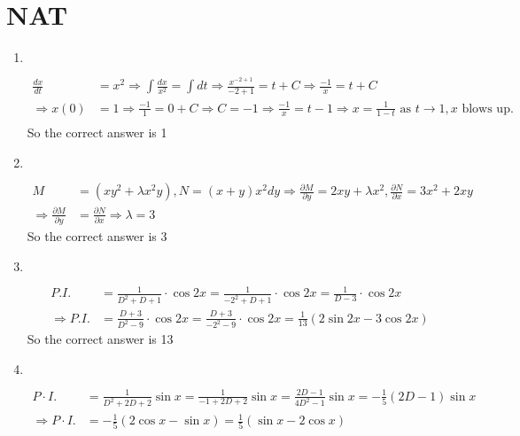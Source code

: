 \section{NAT}
\begin{enumerate}
	\item $\left. \right. $
	\begin{answer}
		\begin{align*}
		\frac{d x}{d t}&=x^{2} \Rightarrow \int \frac{d x}{x^{2}}=\int d t \Rightarrow \frac{x^{-2+1}}{-2+1}=t+C \Rightarrow \frac{-1}{x}=t+C\\
		\Rightarrow x(0)&=1 \Rightarrow \frac{-1}{1}=0+C \Rightarrow C=-1 \Rightarrow \frac{-1}{x}=t-1 \Rightarrow x=\frac{1}{1-t}\text{ as }t \rightarrow 1, x\text{ blows up.}\\
		\end{align*}
			So the correct answer is 1
	\end{answer}
		\item $\left. \right. $
	\begin{answer}
		\begin{align*}
		M&=\left(x y^{2}+\lambda x^{2} y\right), N=(x+y) x^{2} d y \Rightarrow \frac{\partial M}{\partial y}=2 x y+\lambda x^{2}, \frac{\partial N}{\partial x}=3 x^{2}+2 x y\\
		\Rightarrow \frac{\partial M}{\partial y}&=\frac{\partial N}{\partial x} \Rightarrow \lambda=3
		\end{align*}
			So the correct answer is 3
	\end{answer}
		\item $\left. \right. $
	\begin{answer}
		\begin{align*}
			P.I. &=\frac{1}{D^{2}+D+1} \cdot \cos 2 x=\frac{1}{-2^{2}+D+1} \cdot \cos 2 x=\frac{1}{D-3} \cdot \cos 2 x\\
			\Rightarrow P . I .&=\frac{D+3}{D^{2}-9} \cdot \cos 2 x=\frac{D+3}{-2^{2}-9} \cdot \cos 2 x=\frac{1}{13}(2 \sin 2 x-3 \cos 2 x)
		\end{align*}
		So the correct answer is 13
	\end{answer}
		\item $\left. \right. $
\begin{answer}
	\begin{align*}
	P \cdot I .&=\frac{1}{D^{2}+2 D+2} \sin x=\frac{1}{-1+2 D+2} \sin x=\frac{2 D-1}{4 D^{2}-1} \sin x=-\frac{1}{5}(2 D-1) \sin x\\
	\Rightarrow P \cdot I .&=-\frac{1}{5}(2 \cos x-\sin x)=\frac{1}{5}(\sin x-2 \cos x)
	\end{align*}

\end{answer}
\end{enumerate}
